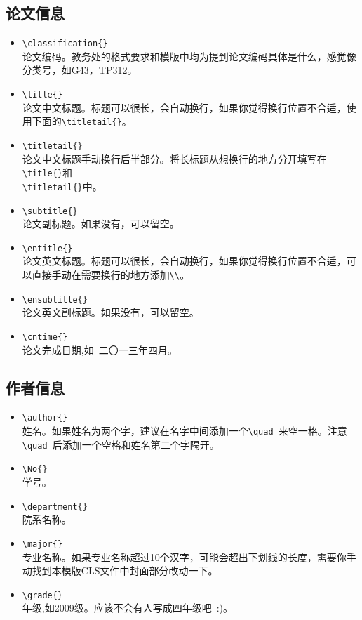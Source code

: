 \subsection{论文信息}
\begin{itemize}
\item \verb|\classification{}|\\
论文编码。教务处的格式要求和模版中均为提到论文编码具体是什么，感觉像分类号，如G43，TP312。
\item \verb|\title{}|\\
	论文中文标题。标题可以很长，会自动换行，如果你觉得换行位置不合适，使用下面的\verb|\titletail{}|。
\item \verb|\titletail{}|\\
	论文中文标题手动换行后半部分。将长标题从想换行的地方分开填写在\verb|\title{}|和\\
\verb|\titletail{}|中。
\item \verb|\subtitle{}|\\
	论文副标题。如果没有，可以留空。
\item \verb|\entitle{}|\\
	论文英文标题。标题可以很长，会自动换行，如果你觉得换行位置不合适，可以直接手动在需要换行的地方添加\verb|\\|。
\item \verb|\ensubtitle{}|\\
	论文英文副标题。如果没有，可以留空。
\item \verb|\cntime{}|\\
	论文完成日期,如~二〇一三年四月。
\end{itemize}
\subsection{作者信息}
\begin{itemize}
\item \verb|\author{}|\\
	姓名。如果姓名为两个字，建议在名字中间添加一个\verb|\quad |来空一格。注意\verb|\quad |后添加一个空格和姓名第二个字隔开。
\item \verb|\No{}|\\
	学号。
\item \verb|\department{}|\\
	院系名称。
\item \verb|\major{}|\\
	专业名称。如果专业名称超过10个汉字，可能会超出下划线的长度，需要你手动找到本模版CLS文件中封面部分改动一下。
\item \verb|\grade{}|\\
	年级,如2009级。应该不会有人写成四年级吧~:)。
\end{itemize}
